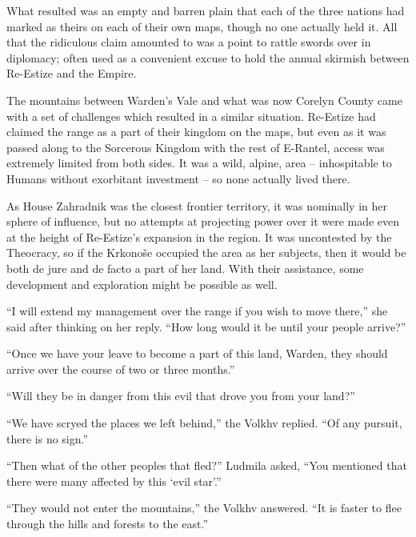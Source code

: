  

What resulted was an empty and barren plain that each of the three nations had marked as theirs on each of their own maps, though no one actually held it. All that the ridiculous claim amounted to was a point to rattle swords over in diplomacy; often used as a convenient excuse to hold the annual skirmish between Re-Estize and the Empire.

 

The mountains between Warden’s Vale and what was now Corelyn County came with a set of challenges which resulted in a similar situation. Re-Estize had claimed the range as a part of their kingdom on the maps, but even as it was passed along to the Sorcerous Kingdom with the rest of E-Rantel, access was extremely limited from both sides. It was a wild, alpine, area – inhospitable to Humans without exorbitant investment – so none actually lived there.

 

As House Zahradnik was the closest frontier territory, it was nominally in her sphere of influence, but no attempts at projecting power over it were made even at the height of Re-Estize’s expansion in the region. It was uncontested by the Theocracy, so if the Krkonoše occupied the area as her subjects, then it would be both de jure and de facto a part of her land. With their assistance, some development and exploration might be possible as well.

 

“I will extend my management over the range if you wish to move there,” she said after thinking on her reply. “How long would it be until your people arrive?”

 

“Once we have your leave to become a part of this land, Warden, they should arrive over the course of two or three months.”

 

“Will they be in danger from this evil that drove you from your land?”

 

“We have scryed the places we left behind,” the Volkhv replied. “Of any pursuit, there is no sign.”

 

“Then what of the other peoples that fled?” Ludmila asked, “You mentioned that there were many affected by this ‘evil star’.”

 

“They would not enter the mountains,” the Volkhv answered. “It is faster to flee through the hills and forests to the east.”

